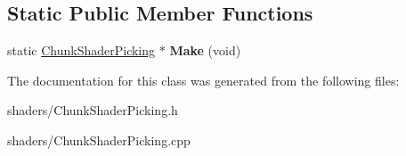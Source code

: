 \subsection*{\-Static \-Public \-Member \-Functions}
\begin{DoxyCompactItemize}
\item 
\hypertarget{classChunkShaderPicking_a7c69d58e0d7b62a3cf96879e42008a46}{static \hyperlink{classChunkShaderPicking}{\-Chunk\-Shader\-Picking} $\ast$ {\bfseries \-Make} (void)}\label{classChunkShaderPicking_a7c69d58e0d7b62a3cf96879e42008a46}

\end{DoxyCompactItemize}


\-The documentation for this class was generated from the following files\-:\begin{DoxyCompactItemize}
\item 
shaders/\-Chunk\-Shader\-Picking.\-h\item 
shaders/\-Chunk\-Shader\-Picking.\-cpp\end{DoxyCompactItemize}
